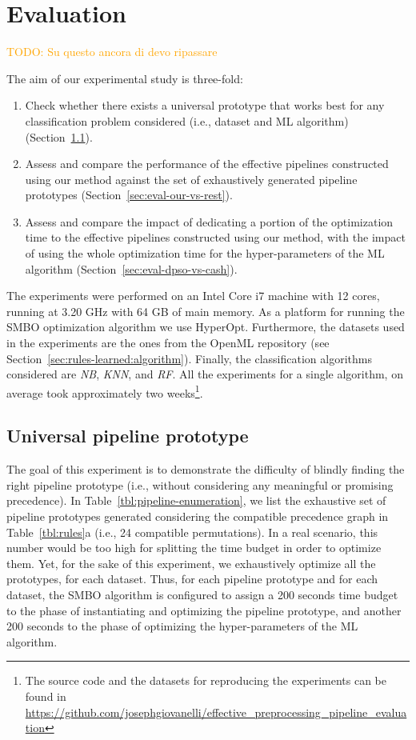 \section{Evaluation}
\label{sec:evaluation}

\textcolor{orange}{TODO: Su questo ancora di devo ripassare}

The aim of our experimental study is three-fold:
\begin{enumerate}
    \item Check whether there exists a universal prototype that works best for any classification problem considered  (i.e., dataset and ML algorithm) (Section~\ref{sec:eval-universal-pipeline}).
    \item Assess and compare the performance of the effective pipelines constructed using our method against the set of exhaustively generated pipeline prototypes (Section~\ref{sec:eval-our-vs-rest}).
    \item Assess and compare the impact of dedicating a portion of the optimization time to the effective pipelines constructed using our method, with the impact of using the whole optimization time for the hyper-parameters of the ML algorithm (Section~\ref{sec:eval-dpso-vs-cash}).
\end{enumerate}

The experiments were performed on an Intel Core i7 machine with 12 cores, running at 3.20 GHz with 64 GB of main memory. As a platform for running the SMBO optimization algorithm we use HyperOpt. Furthermore, the datasets used in the experiments are the ones from the OpenML repository (see Section~\ref{sec:rules-learned:algorithm}). Finally, the classification algorithms considered are \textit{NB}, \textit{KNN}, and \textit{RF}. All the experiments for a single algorithm, on average took approximately two weeks\footnote{The source code and the datasets for reproducing the experiments can be found in 
\href{https://github.com/josephgiovanelli/effective\_preprocessing\_pipeline\_evaluation}{https://github.com/josephgiovanelli/effective\_preprocessing\_pipeline\_evaluation}}.

\subsection{Universal pipeline prototype}
\label{sec:eval-universal-pipeline}
The goal of this experiment is to demonstrate the difficulty of blindly finding the right pipeline prototype (i.e., without considering any meaningful or promising precedence).
In Table~\ref{tbl:pipeline-enumeration}, we list the exhaustive set of pipeline prototypes generated considering the compatible precedence graph in Table~\ref{tbl:rules}a (i.e., 24 compatible permutations). In a real scenario, this number would be too high for splitting the time budget in order to optimize them. 
Yet, for the sake of this experiment, we exhaustively optimize all the prototypes, for each dataset. Thus, for each pipeline prototype and for each dataset, the SMBO algorithm is configured to assign a 200 seconds time budget to the phase of instantiating and optimizing the pipeline prototype, and another 200 seconds to the phase of optimizing the hyper-parameters of the ML algorithm.

